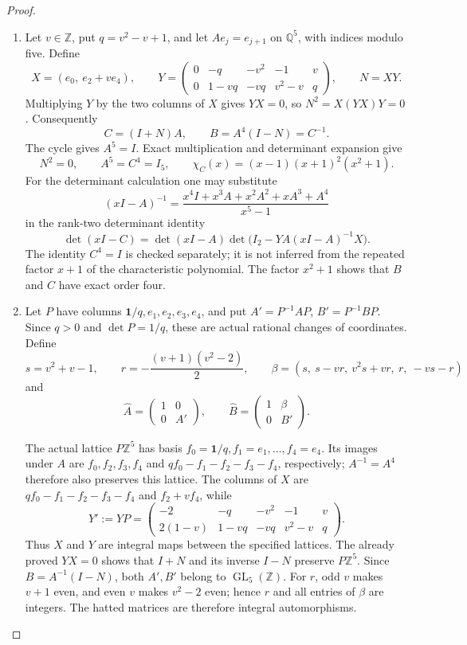 \begin{proof}
\begin{enumerate}[label=\arabic*.]
\item Let $v\in\mathbb Z$, put $q=v^2-v+1$, and let
$Ae_j=e_{j+1}$ on $\mathbb Q^5$, with indices modulo five. Define
\[
 X=(e_0,\ e_2+ve_4),\qquad
 Y=\begin{pmatrix}
 0&-q&-v^2&-1&v\\
 0&1-vq&-vq&v^2-v&q
 \end{pmatrix},\qquad N=XY.
 \tag{F.U1}\label{maps:eq:F.U1}
\]
Multiplying $Y$ by the two columns of $X$ gives $YX=0$, so
$N^2=X(YX)Y=0$. Consequently
\[
 C=(I+N)A,\qquad B=A^4(I-N)=C^{-1}.
\]
The cycle gives $A^5=I$. Exact multiplication and determinant
expansion give
\[
 N^2=0,\qquad A^5=C^4=I_5,\qquad
 \chi_C(x)=(x-1)(x+1)^2(x^2+1).
 \tag{F.U2}\label{maps:eq:F.U2}
\]
For the determinant calculation one may substitute
\[
 (xI-A)^{-1}=
 \frac{x^4I+x^3A+x^2A^2+xA^3+A^4}{x^5-1}
\]
in the rank-two determinant identity
\[
 \det(xI-C)=\det(xI-A)
       \det\bigl(I_2-YA(xI-A)^{-1}X\bigr).
\]
The identity $C^4=I$ is checked separately; it is not inferred
from the repeated factor $x+1$ of the characteristic polynomial.
The factor $x^2+1$ shows that $B$ and $C$ have exact order four.

\item Let $P$ have columns $\mathbf1/q,e_1,e_2,e_3,e_4$, and put
$A'=P^{-1}AP$, $B'=P^{-1}BP$. Since $q>0$ and $\det P=1/q$,
these are actual rational changes of coordinates. Define
\[
 s=v^2+v-1,\qquad r=-\frac{(v+1)(v^2-2)}2,
 \qquad
 \beta=(s,\ s-vr,\ v^2s+vr,\ r,\ -vs-r)
 \tag{F.U3}\label{maps:eq:F.U3}
\]
and
\[
 \widehat A=\begin{pmatrix}1&0\\0&A'\end{pmatrix},\qquad
 \widehat B=\begin{pmatrix}1&\beta\\0&B'\end{pmatrix}.
 \tag{F.U4}\label{maps:eq:F.U4}
\]

The actual lattice $P\mathbb Z^5$ has basis
$f_0=\mathbf1/q,f_1=e_1,\ldots,f_4=e_4$.
Its images under $A$ are $f_0,f_2,f_3,f_4$ and
$qf_0-f_1-f_2-f_3-f_4$, respectively; $A^{-1}=A^4$
therefore also preserves this lattice. The columns of $X$ are
$qf_0-f_1-f_2-f_3-f_4$ and $f_2+vf_4$, while
\[
 Y':=YP=\begin{pmatrix}
 -2&-q&-v^2&-1&v\\
 2(1-v)&1-vq&-vq&v^2-v&q
 \end{pmatrix}.
\]
Thus $X$ and $Y$ are integral maps between the specified lattices.
The already proved $YX=0$ shows that $I+N$ and its inverse $I-N$
preserve $P\mathbb Z^5$. Since $B=A^{-1}(I-N)$, both
$A',B'$ belong to $\operatorname{GL}_5(\mathbb Z)$.
For $r$, odd $v$ makes $v+1$ even, and even $v$ makes
$v^2-2$ even; hence $r$ and all entries of $\beta$ are integers.
The hatted matrices are therefore integral automorphisms.


\end{enumerate}
\end{proof}
